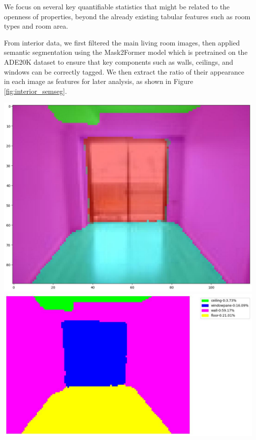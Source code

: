 \documentclass[11pt,a4paper]{article}
\begin{document}
\begin{multicols}{2}
We focus on several key quantifiable statistics that might be related to the openness of properties, beyond the 
already existing tabular features such as room types and room area.

From interior data, we first filtered the main living room images, then applied semantic segmentation using the 
Mask2Former model which is pretrained on the ADE20K dataset to ensure that key components such as walls, ceilings, 
and windows can be correctly tagged. We then extract the ratio of their appearance in each image as features for 
later analysis, as shown in Figure \ref{fig:interior_semseg}. 
\begin{flushleft}
    \includegraphics[width=0.8\columnwidth]{plots/exp_lv_semseg_2.jpg}
    \\[0.5em]
    \includegraphics[width=\columnwidth]{plots/exp_lv_semseg_1.jpg}
    \label{fig:interior_semseg}
\end{flushleft}



\end{multicols}
\end{document}
